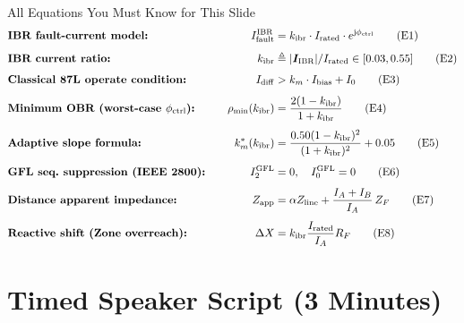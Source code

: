 \documentclass[12pt,a4paper]{article}
\newcommand{\kibr}{k_\mathrm{ibr}}
\newcommand{\Ifault}{I_\mathrm{fault}}
\newcommand{\Irated}{I_\mathrm{rated}}
\newcommand{\Idiff}{I_\mathrm{diff}}
\newcommand{\Ibias}{I_\mathrm{bias}}
\newcommand{\km}{k_m}
\newcommand{\Izero}{I_0}
\newcommand{\Zapp}{Z_\mathrm{app}}
\newcommand{\Zline}{Z_\mathrm{line}}
\newcommand{\phictrl}{\phi_\mathrm{ctrl}}
\newcommand{\jj}{\mathrm{j}}
\begin{document}
\begin{formulabox}{All Equations You Must Know for This Slide}
\begin{alignat}{2}
  &\text{\textbf{IBR fault-current model:}} &\quad
  \Ifault^\mathrm{IBR} &= \kibr \cdot \Irated \cdot e^{\jj\phictrl}
  \tag{E1}\label{E1} \\[4pt]
  &\text{\textbf{IBR current ratio:}} &\quad
  \kibr &\triangleq |\bm{I}_\mathrm{IBR}| / \Irated \in [0.03, 0.55]
  \tag{E2}\label{E2} \\[4pt]
  &\text{\textbf{Classical 87L operate condition:}} &\quad
  \Idiff &> \km \cdot \Ibias + \Izero
  \tag{E3}\label{E3} \\[4pt]
  &\text{\textbf{Minimum OBR (worst-case $\phictrl$):}} &\quad
  \rho_\mathrm{min}(\kibr) &= \frac{2(1-\kibr)}{1+\kibr}
  \tag{E4}\label{E4} \\[4pt]
  &\text{\textbf{Adaptive slope formula:}} &\quad
  \km^*(\kibr) &= \frac{0.50(1-\kibr)^2}{(1+\kibr)^2} + 0.05
  \tag{E5}\label{E5} \\[4pt]
  &\text{\textbf{GFL seq.\ suppression (IEEE 2800):}} &\quad
  I_2^\mathrm{GFL} &= 0, \quad I_0^\mathrm{GFL} = 0
  \tag{E6}\label{E6} \\[4pt]
  &\text{\textbf{Distance apparent impedance:}} &\quad
  \Zapp &= \alpha\Zline + \frac{I_A + I_B}{I_A}\,Z_F
  \tag{E7}\label{E7} \\[4pt]
  &\text{\textbf{Reactive shift (Zone overreach):}} &\quad
  \Delta X &= \kibr \frac{\Irated}{I_A} R_F
  \tag{E8}\label{E8}
\end{alignat}
\end{formulabox}

\section{Timed Speaker Script (3 Minutes)}
\end{document}
